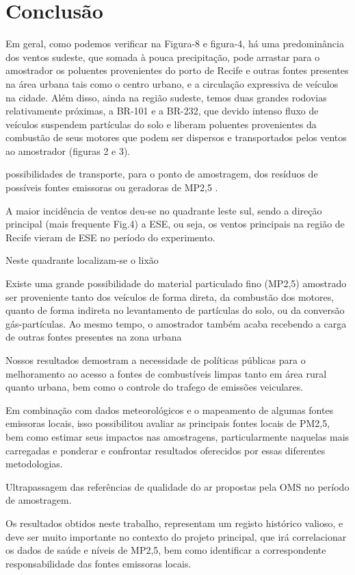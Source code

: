 \chapter{Conclusão}

Em geral, como podemos verificar na Figura-8 e figura-4, há uma  predominância dos ventos sudeste, que somada à pouca precipitação, pode arrastar para o amostrador os poluentes provenientes do porto de Recife e outras fontes presentes na área urbana tais como o centro urbano, e a  circulação expressiva de veículos na cidade. Além disso, ainda na região sudeste, temos duas grandes rodovias relativamente próximas, a BR-101 e a BR-232, que devido intenso fluxo de veículos suspendem partículas do solo e liberam poluentes provenientes da combustão de seus motores que podem ser dispersos e transportados pelos ventos ao amostrador (figuras 2 e 3).


possibilidades de transporte, para o ponto de amostragem, dos resíduos de possíveis fontes emissoras ou geradoras  de MP2,5 .

A maior incidência de ventos deu-se no quadrante leste sul, sendo a direção principal (mais frequente Fig.4) a ESE, ou seja, os ventos principais na região de Recife vieram de ESE no período do experimento.

Neste quadrante localizam-se o lixão

Existe uma grande possibilidade do material particulado fino (MP2,5) amostrado ser proveniente tanto dos veículos de forma direta, da combustão dos motores, quanto de forma indireta no levantamento de partículas do solo, ou da conversão gás-partículas. Ao mesmo tempo, o amostrador também acaba recebendo a carga de outras fontes presentes na zona urbana

Nossos resultados demostram a necessidade de políticas públicas para o 
melhoramento ao acesso a fontes de combustíveis limpas tanto em área rural 
quanto urbana, bem como o controle do trafego de emissões veiculares.

Em combinação com dados meteorológicos e o mapeamento de algumas fontes emissoras locais, isso possibilitou avaliar as principais fontes locais de PM2,5, bem como estimar seus impactos nas amostragens, particularmente naquelas mais carregadas e ponderar e confrontar resultados oferecidos por essas diferentes metodologias.

Ultrapassagem das referências de qualidade do ar propostas pela OMS no período de amostragem. 

Os resultados obtidos neste trabalho, representam um registo histórico valioso, 
e deve ser muito importante no contexto do projeto principal, que irá correlacionar os dados de saúde e níveis de MP2,5, bem como identificar a correspondente responsabilidade das fontes emissoras locais.

